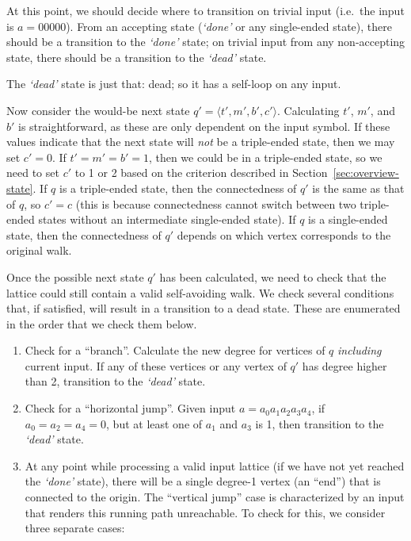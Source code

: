 At this point, we should decide where to transition on trivial input (i.e.\ the input is $a=00000$). From an accepting state (\emph{`done'} or any single-ended state), there should be a transition to the \emph{`done'} state; on trivial input from any non-accepting state, there should be a transition to the \emph{`dead'} state.

The \emph{`dead'} state is just that: dead; so it has a self-loop on any input.

Now consider the would-be next state $q'=\langle t', m', b', c' \rangle$. Calculating $t'$, $m'$, and $b'$ is straightforward, as these are only dependent on the input symbol. If these values indicate that the next state will \emph{not} be a triple-ended state, then we may set $c'=0$. If $t'=m'=b'=1$, then we could be in a triple-ended state, so we need to set $c'$ to 1 or 2 based on the criterion described in Section~\ref{sec:overview-state}. If $q$ is a triple-ended state, then the connectedness of $q'$ is the same as that of $q$, so $c'=c$ (this is because connectedness cannot switch between two triple-ended states without an intermediate single-ended state). If $q$ is a single-ended state, then the connectedness of $q'$ depends on which vertex corresponds to the original walk.

Once the possible next state $q'$ has been calculated, we need to check that the lattice could still contain a valid self-avoiding walk. We check several conditions that, if satisfied, will result in a transition to a dead state. These are enumerated in the order that we check them below.
\begin{enumerate}
\item Check for a ``branch''. Calculate the new degree for vertices of $q$ \emph{including} current input. If any of these vertices or any vertex of $q'$ has degree higher than 2, transition to the \emph{`dead'} state.
\item Check for a ``horizontal jump''. Given input $a=a_0a_1a_2a_3a_4$, if $a_0 = a_2 = a_4 = 0$, but at least one of $a_1$ and $a_3$ is 1, then transition to the \emph{`dead'} state.
\item At any point while processing a valid input lattice (if we have not yet reached the \emph{`done'} state), there will be a single degree-1 vertex (an ``end'') that is connected to the origin. The ``vertical jump'' case is characterized by an input that renders this running path unreachable. To check for this, we consider three separate cases:
\begin{itemize}
\item If $q$ is single-ended, then check that its degree-1 vertex connects to the input symbol. If it does not, transition to the \emph{`dead'} state. 
\item If $q$ is double-ended, then check that \emph{
\item 
\end{itemize}
\end{enumerate}
